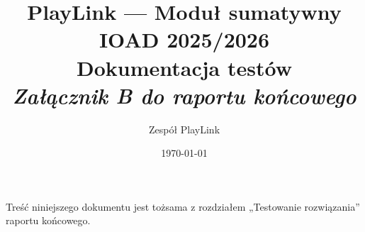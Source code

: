 \documentclass[12pt,a4paper]{article}
\title{
    \large PlayLink — Moduł sumatywny IOAD 2025/2026 \\[0.3em]
    \Huge \textbf{Dokumentacja testów} \\[0.3em]
    \large \textit{Załącznik B do raportu końcowego}
}
\author{Zespół PlayLink}
\date{\today}
\begin{document}
\maketitle
\begin{center}\small
Treść niniejszego dokumentu jest tożsama z rozdziałem „Testowanie rozwiązania''
raportu końcowego.
\end{center}
\vspace{1em}


\end{document}
